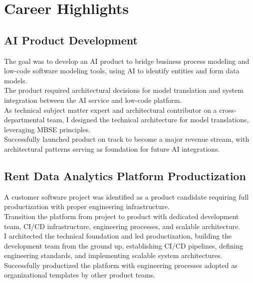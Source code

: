 %
%
\section{Career Highlights}

\subsection{AI Product Development}
    The goal was to develop an AI product to bridge business process modeling and low-code
    software modeling tools, using AI to identify entities and form data models.\\
    The product required architectural decisions for model translation and system integration
    between the AI service and low-code platform.\\
    As technical subject matter expert and architectural contributor on a cross-departmental team,
    I designed the technical architecture for model translations, leveraging MBSE principles.\\
    Successfully launched product on track to become a major revenue stream, with architectural
    patterns serving as foundation for future AI integrations.\\

\subsection{Rent Data Analytics Platform Productization}
    A customer software project was identified as a product candidate requiring full
    productization with proper engineering infrastructure.\\
    Transition the platform from project to product with dedicated development team, CI/CD
    infrastructure, engineering processes, and scalable architecture.\\
    I architected the technical foundation and led productization, building the development
    team from the ground up, establishing CI/CD pipelines, defining engineering standards,
    and implementing scalable system architectures.\\
    Successfully productized the platform with engineering processes adopted as organizational
    templates by other product teams.\\

